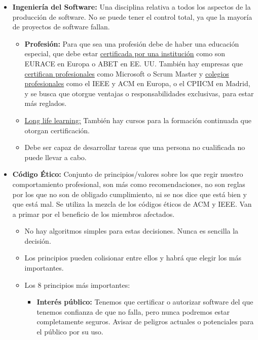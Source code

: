 \documentclass[12pt, twoside, openright]{report} %
\begin{document}
\begin{itemize}
\begin{itemize}
  \end{itemize}
\item \textbf{Ingeniería del Software:} Una disciplina relativa a todos los
  aspectos de la producción de software. No se puede tener el control
  total, ya que la mayoría de proyectos de software fallan.
  

  \begin{itemize}
  \item \textbf{Profesión:} Para que sea una profesión debe de haber una
    educación especial, que debe estar \underline{certificada por una
    institución} como son EURACE en Europa o ABET en EE. UU. También hay
    empresas que \underline{certifican profesionales} como Microsoft o
    Scrum Master y \underline{colegios profesionales} como el IEEE y ACM
    en Europa, o el CPIICM en Madrid, y se busca que otorgue ventajas o
    responsabilidades exclusivas, para estar más reglados.
    
  \item \underline{Long life learning:} También hay cursos para la formación
    continuada que otorgan certificación.
    
  \item Debe ser capaz de desarrollar tareas que una persona no cualificada
    no puede llevar a cabo.
    
  \end{itemize}
\item \textbf{Código Ético:} Conjunto de principios/valores sobre los que
  regir nuestro comportamiento profesional, son más como
  recomendaciones, no son reglas por los que no son de obligado
  cumplimiento, ni se nos dice que está bien y que está mal. Se utiliza
  la mezcla de los códigos éticos de ACM y IEEE. Van a primar por el
  beneficio de los miembros afectados.
  

  \begin{itemize}
  \item No hay algoritmos simples para estas decisiones. Nunca es sencilla
    la decisión.
    
  \item Los principios pueden colisionar entre ellos y habrá que elegir los
    más importantes.
    
  \item Los 8 principios más importantes:
    

    \begin{itemize}
    \item \textbf{Interés público:} Tenemos que certificar o autorizar
      software del que tenemos confianza de que no falla, pero nunca
      podremos estar completamente seguros. Avisar de peligros actuales
      o potenciales para el público por su uso.
      

\end{itemize}
\end{itemize}
\end{itemize}
\end{document}
